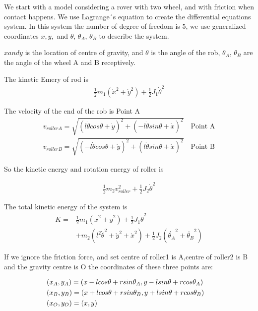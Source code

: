 \documentclass[12 pt]{article}
\begin{document}
We start with a model considering a rover with two wheel, and with friction when contact happens.
We use Lagrange´s equation to create the differential equations system.
In this system the number of degree of freedom is 5, we use generalized coordinates $x,y,$ and $\theta$, $\theta_A$, $\theta_B$ to describe the system.

$x and y$ is the location of centre of gravity, and $\theta$ is the angle of the rob, $\theta_A$, $\theta_B$ are the angle of the wheel A and B receptively.


The kinetic Emery of rod is 
\begin{eqnarray}
\frac{1}{2}m_1(\dot{x}^2+\dot{y}^2)+\frac{1}{2}J_1\dot{\theta}^2
\end{eqnarray}


The velocity of the end of the rob is
Point A
\begin{eqnarray}
&v_{rollerA}=\sqrt{(l\dot{\theta}cos\theta+\dot{y})^2+(-l\dot{\theta}sin\theta+\dot{x})^2} \quad \text{Point A}&\\
&v_{rollerB}=\sqrt{(-l\dot{\theta}cos\theta+\dot{y})^2+(l\dot{\theta}sin\theta+\dot{x})^2} \quad \text{Point B}&
\end{eqnarray}

So the kinetic energy and rotation energy of roller is

\begin{eqnarray}
\frac{1}{2}m_2v_{roller}^2+\frac{1}{2}J_2\dot{\theta}^2
\end{eqnarray}

The total kinetic energy of the system is
\begin{equation}
\begin{aligned}
K=&\frac{1}{2}m_1(\dot{x}^2+\dot{y}^2)+\frac{1}{2}J_1\dot{\theta}^2\\
&+m_2(l^2\dot{\theta}^2+\dot{y}^2
+\dot{x}^2)+\frac{1}{2}J_2(\dot{\theta_A}^2+\dot{\theta_B}^2)
\label{k1}
\end{aligned}
\end{equation}

If we ignore the friction force, and set centre of roller1 is A,centre of roller2 is B and the gravity centre is O
the coordinates of these three points are:

\begin{eqnarray}
&(x_A,y_A)=(x-lcos\theta+rsin\theta_A,y-lsin\theta+rcos\theta_A)& \notag \\
&(x_B,y_B)=(x+lcos\theta+rsin\theta_B,y+lsin\theta+rcos\theta_B)& \notag \\
&(x_O,y_O)=(x,y)& \notag 
\end{eqnarray}
\end{document}
